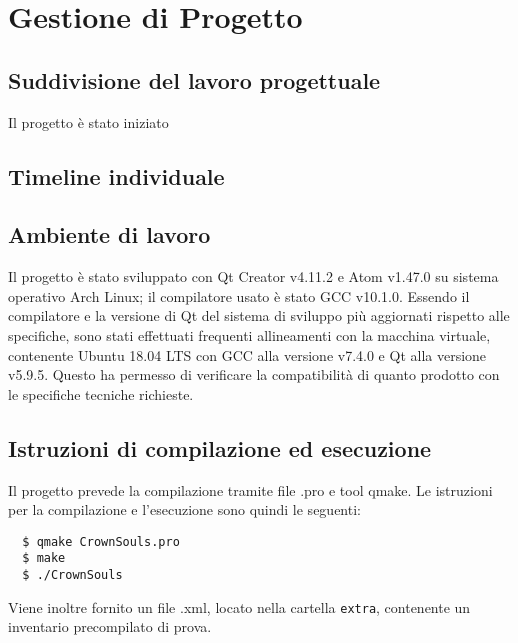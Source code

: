 \section{Gestione di Progetto}

\subsection{Suddivisione del lavoro progettuale}
Il progetto è stato iniziato

\subsection{Timeline individuale}

\subsection{Ambiente di lavoro}
Il progetto è stato sviluppato con Qt Creator v4.11.2 e Atom v1.47.0 su sistema operativo Arch Linux; il compilatore usato è stato GCC v10.1.0. Essendo il compilatore e la versione di Qt del sistema di sviluppo più aggiornati rispetto alle specifiche, sono stati effettuati frequenti allineamenti con la macchina virtuale, contenente Ubuntu 18.04 LTS con GCC alla versione v7.4.0 e Qt alla versione v5.9.5. Questo ha permesso di verificare la compatibilità di quanto prodotto con le specifiche tecniche richieste.

\subsection{Istruzioni di compilazione ed esecuzione}
Il progetto prevede la compilazione tramite file .pro e tool qmake. Le istruzioni per la compilazione e l'esecuzione sono quindi le seguenti:
\begin{center}
\centering
\begin{verbatim}
  $ qmake CrownSouls.pro
  $ make
  $ ./CrownSouls
\end{verbatim}
\end{center}

Viene inoltre fornito un file .xml, locato nella cartella \texttt{extra}, contenente un inventario precompilato di prova.
